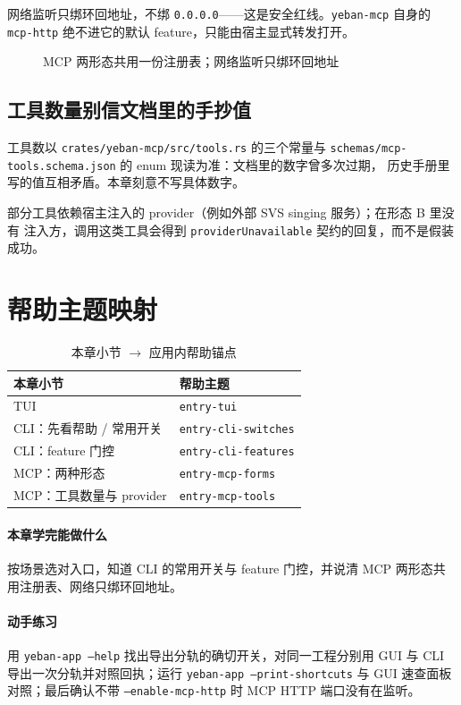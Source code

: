网络监听只绑环回地址，不绑 \texttt{0.0.0.0}——这是安全红线。\texttt{yeban-mcp}
自身的 \texttt{mcp-http} 绝不进它的默认 feature，只能由宿主显式转发打开。


\begin{figure}[htbp]
\centering
{}
\caption{MCP 两形态共用一份注册表；网络监听只绑环回地址}
\label{fig:ch10-mcp-forms}
\end{figure}

\subsection{工具数量别信文档里的手抄值}

工具数以 \texttt{crates/yeban-mcp/src/tools.rs} 的三个常量与
\texttt{schemas/mcp-tools.schema.json} 的 enum 现读为准：文档里的数字曾多次过期，
历史手册里写的值互相矛盾。本章刻意不写具体数字。

部分工具依赖宿主注入的 provider（例如外部 SVS singing 服务）；在形态 B 里没有
注入方，调用这类工具会得到 \texttt{providerUnavailable} 契约的回复，而不是假装成功。

\section{帮助主题映射}

\begin{table}[htbp]
\centering
\caption{本章小节 $\to$ 应用内帮助锚点}
\label{tab:ch10-help}
\begin{tabular}{ll}
\hline
本章小节 & 帮助主题 \\
\hline
TUI & \texttt{entry-tui} \\
CLI：先看帮助 / 常用开关 & \texttt{entry-cli-switches} \\
CLI：feature 门控 & \texttt{entry-cli-features} \\
MCP：两种形态 & \texttt{entry-mcp-forms} \\
MCP：工具数量与 provider & \texttt{entry-mcp-tools} \\
\hline
\end{tabular}
\end{table}

\paragraph{本章学完能做什么} 按场景选对入口，知道 CLI 的常用开关与 feature 门控，并说清 MCP 两形态共用注册表、网络只绑环回地址。

\paragraph{动手练习} 用 \texttt{yeban-app --help} 找出导出分轨的确切开关，对同一工程分别用 GUI 与 CLI 导出一次分轨并对照回执；运行 \texttt{yeban-app --print-shortcuts} 与 GUI 速查面板对照；最后确认不带 \texttt{--enable-mcp-http} 时 MCP HTTP 端口没有在监听。
